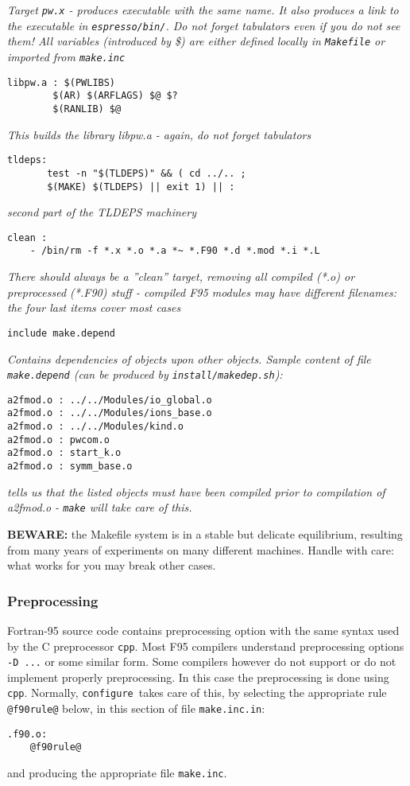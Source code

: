 \documentclass[12pt,a4paper]{article}
\def\configure{\texttt{configure}}
\def\make.inc{\texttt{make.inc}}
\begin{document}
{\em Target {\tt pw.x} - produces executable with the same name.
It also produces a link to the executable in {\tt espresso/bin/}.
Do not forget tabulators even if you do not see them!
All variables (introduced by \$) are either defined locally
in {\tt Makefile} or imported from {\tt make.inc}}
\begin{verbatim}
libpw.a : $(PWLIBS)
        $(AR) $(ARFLAGS) $@ $?
        $(RANLIB) $@
\end{verbatim}
{\em This builds the library libpw.a - again, do not forget tabulators}
\begin{verbatim}
tldeps:
       test -n "$(TLDEPS)" && ( cd ../.. ;
       $(MAKE) $(TLDEPS) || exit 1) || :
\end{verbatim}
{\em second part of the TLDEPS machinery}
\begin{verbatim}
clean :
    - /bin/rm -f *.x *.o *.a *~ *.F90 *.d *.mod *.i *.L
\end{verbatim}
{\em There should always be a ''clean'' target, removing all compiled (*.o)
or preprocessed (*.F90) stuff - compiled F95 modules may have different
filenames: the four last items cover most cases}
\begin{verbatim}
include make.depend
\end{verbatim}
{\em Contains dependencies of objects upon other objects. Sample
content of file {\tt make.depend} (can be produced by {\tt install/makedep.sh}):}
\begin{verbatim}
a2fmod.o : ../../Modules/io_global.o
a2fmod.o : ../../Modules/ions_base.o
a2fmod.o : ../../Modules/kind.o
a2fmod.o : pwcom.o
a2fmod.o : start_k.o
a2fmod.o : symm_base.o
\end{verbatim}
{\em tells us that the listed objects must have been compiled
prior to compilation of a2fmod.o - {\tt make} will take care of this.}

{\bf BEWARE:} the Makefile system is in a stable but delicate equilibrium,
resulting from many years of experiments on many different machines.
Handle with care: what works for you may break other cases.

\subsubsection{Preprocessing}

\label{SubSec:CPP}
Fortran-95 source code contains preprocessing option with
the same syntax used by the C preprocessor \texttt{cpp}.
Most F95 compilers understand preprocessing options \texttt{-D ...}
or some similar form. Some compilers however do not support
or do not implement properly preprocessing. In this case the
preprocessing is done using \texttt{cpp}.
Normally, \configure\ takes care of this, by selecting the
appropriate rule \texttt{@f90rule@} below, in this section
of file \texttt{make.inc.in}:
\begin{verbatim}
.f90.o:
	@f90rule@
\end{verbatim}
and producing the appropriate file \make.inc.
\end{document}
